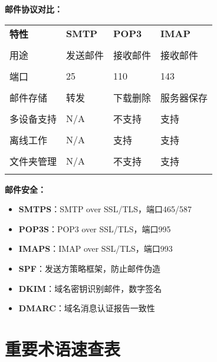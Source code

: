 \documentclass[lang=cn,newtx,10pt,scheme=chinese]{../../elegantbook}
\begin{document}
\textbf{邮件协议对比：}
\begin{longtable}{@{}p{2.5cm}p{4cm}p{3cm}p{3cm}@{}}
\toprule
\textbf{特性} & \textbf{SMTP} & \textbf{POP3} & \textbf{IMAP} \\\\ \midrule
\endhead

用途 & 发送邮件 & 接收邮件 & 接收邮件 \\\\
端口 & 25 & 110 & 143 \\\\
邮件存储 & 转发 & 下载删除 & 服务器保存 \\\\
多设备支持 & N/A & 不支持 & 支持 \\\\
离线工作 & N/A & 支持 & 支持 \\\\
文件夹管理 & N/A & 不支持 & 支持 \\\\

\bottomrule
\end{longtable}

\textbf{邮件安全：}
\begin{itemize}
  \item \textbf{SMTPS}：SMTP over SSL/TLS，端口465/587
  \item \textbf{POP3S}：POP3 over SSL/TLS，端口995
  \item \textbf{IMAPS}：IMAP over SSL/TLS，端口993
  \item \textbf{SPF}：发送方策略框架，防止邮件伪造
  \item \textbf{DKIM}：域名密钥识别邮件，数字签名
  \item \textbf{DMARC}：域名消息认证报告一致性
\end{itemize}



\appendix

\chapter{重要术语速查表}
\end{document}
